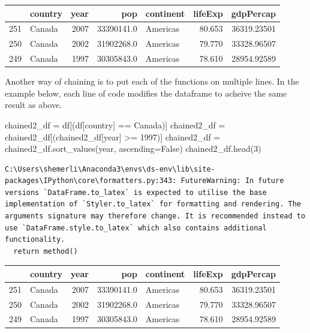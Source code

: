 \documentclass[
  letterpaper,
  DIV=11,
  numbers=noendperiod]{scrreprt}
\newenvironment{Shaded}{\begin{snugshade}}{\end{snugshade}}
\newcommand{\DecValTok}[1]{\textcolor[rgb]{0.68,0.00,0.00}{#1}}
\newcommand{\NormalTok}[1]{\textcolor[rgb]{0.00,0.23,0.31}{#1}}
\newcommand{\OperatorTok}[1]{\textcolor[rgb]{0.37,0.37,0.37}{#1}}
\newcommand{\StringTok}[1]{\textcolor[rgb]{0.13,0.47,0.30}{#1}}
\newcommand{\VariableTok}[1]{\textcolor[rgb]{0.07,0.07,0.07}{#1}}
\begin{document}
\begin{tabular}{llrrlrr}
\toprule
{} & country &  year &         pop & continent &  lifeExp &    gdpPercap \\
\midrule
251 &  Canada &  2007 &  33390141.0 &  Americas &   80.653 &  36319.23501 \\
250 &  Canada &  2002 &  31902268.0 &  Americas &   79.770 &  33328.96507 \\
249 &  Canada &  1997 &  30305843.0 &  Americas &   78.610 &  28954.92589 \\
\bottomrule
\end{tabular}

Another way of chaining is to put each of the functions on multiple
lines. In the example below, each line of code modifies the dataframe to
acheive the same result as above.

\begin{Shaded}
\begin{Highlighting}[]
\NormalTok{chained2\_df }\OperatorTok{=}\NormalTok{ df[(df[}\StringTok{\textquotesingle{}country\textquotesingle{}}\NormalTok{] }\OperatorTok{==} \StringTok{\textquotesingle{}Canada\textquotesingle{}}\NormalTok{)]}
\NormalTok{chained2\_df }\OperatorTok{=}\NormalTok{ chained2\_df[(chained2\_df[}\StringTok{\textquotesingle{}year\textquotesingle{}}\NormalTok{] }\OperatorTok{\textgreater{}=} \DecValTok{1997}\NormalTok{)]}
\NormalTok{chained2\_df }\OperatorTok{=}\NormalTok{ chained2\_df.sort\_values(}\StringTok{\textquotesingle{}year\textquotesingle{}}\NormalTok{, ascending}\OperatorTok{=}\VariableTok{False}\NormalTok{)}
\NormalTok{chained2\_df.head(}\DecValTok{3}\NormalTok{)}
\end{Highlighting}
\end{Shaded}

\begin{verbatim}
C:\Users\shemerli\Anaconda3\envs\ds-env\lib\site-packages\IPython\core\formatters.py:343: FutureWarning: In future versions `DataFrame.to_latex` is expected to utilise the base implementation of `Styler.to_latex` for formatting and rendering. The arguments signature may therefore change. It is recommended instead to use `DataFrame.style.to_latex` which also contains additional functionality.
  return method()
\end{verbatim}

\begin{tabular}{llrrlrr}
\toprule
{} & country &  year &         pop & continent &  lifeExp &    gdpPercap \\
\midrule
251 &  Canada &  2007 &  33390141.0 &  Americas &   80.653 &  36319.23501 \\
250 &  Canada &  2002 &  31902268.0 &  Americas &   79.770 &  33328.96507 \\
249 &  Canada &  1997 &  30305843.0 &  Americas &   78.610 &  28954.92589 \\
\bottomrule
\end{tabular}
\end{document}
